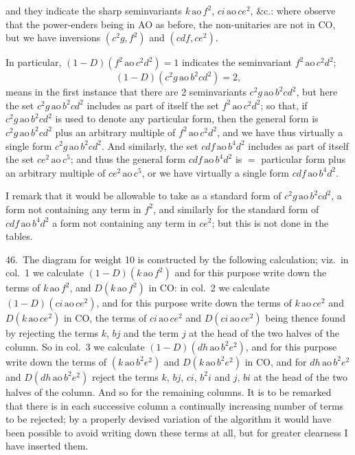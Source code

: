 \documentclass[11pt]{article}
\begin{document}
and they indicate the sharp seminvariants $k\,\mathrm{ao}\,f^2$, $ci\,\mathrm{ao}\,ce^2$, \&c.: where observe that the power-enders being in AO as before, the non-unitaries are not in CO, but we have inversions $(c^2 g, f^2)$ and $(cdf, ce^2)$.

In particular, $(1 - D)(f^2\,\mathrm{ao}\,c^2 d^2) = 1$ indicates the seminvariant $f^2\,\mathrm{ao}\,c^2 d^2$;
\[
(1 - D)(c^2 g\,\mathrm{ao}\,b^2 c d^2) = 2,
\]
means in the first instance that there are 2 seminvariants $c^2 g\,\mathrm{ao}\,b^2 c d^2$, but here the set $c^2 g\,\mathrm{ao}\,b^2 c d^2$ includes as part of itself the set $f^2\,\mathrm{ao}\,c^2 d^2$; so that, if $c^2 g\,\mathrm{ao}\,b^2 c d^2$ is used to denote any particular form, then the general form is $c^2 g\,\mathrm{ao}\,b^2 c d^2$ plus an arbitrary multiple of $f^2\,\mathrm{ao}\,c^2 d^2$, and we have thus virtually a single form $c^2 g\,\mathrm{ao}\,b^2 c d^2$. And similarly, the set $cdf\,\mathrm{ao}\,b^4 d^2$ includes as part of itself the set $ce^2\,\mathrm{ao}\,c^5$; and thus the general form $cdf\,\mathrm{ao}\,b^4 d^2$ is $=$ particular form plus an arbitrary multiple of $ce^2\,\mathrm{ao}\,c^5$, or we have virtually a single form $cdf\,\mathrm{ao}\,b^4 d^2$.

I remark that it would be allowable to take as a standard form of $c^2 g\,\mathrm{ao}\,b^2 c d^2$, a form not containing any term in $f^2$, and similarly for the standard form of $cdf\,\mathrm{ao}\,b^4 d^2$ a form not containing any term in $ce^2$; but this is not done in the tables.

46.\ The diagram for weight 10 is constructed by the following calculation; viz.\ in col.\ 1 we calculate $(1 - D)(k\,\mathrm{ao}\,f^2)$ and for this purpose write down the terms of $k\,\mathrm{ao}\,f^2$, and $D(k\,\mathrm{ao}\,f^2)$ in CO: in col.\ 2 we calculate $(1 - D)(ci\,\mathrm{ao}\,ce^2)$, and for this purpose write down the terms of $k\,\mathrm{ao}\,ce^2$ and $D(k\,\mathrm{ao}\,ce^2)$ in CO, the terms of $ci\,\mathrm{ao}\,ce^2$ and $D(ci\,\mathrm{ao}\,ce^2)$ being thence found by rejecting the terms $k$, $bj$ and the term $j$ at the head of the two halves of the column. So in col.\ 3 we calculate $(1 - D)(dh\,\mathrm{ao}\,b^2 e^2)$, and for this purpose write down the terms of $(k\,\mathrm{ao}\,b^2 e^2)$ and $D(k\,\mathrm{ao}\,b^2 e^2)$ in CO, and for $dh\,\mathrm{ao}\,b^2 e^2$ and $D(dh\,\mathrm{ao}\,b^2 e^2)$ reject the terms $k$, $bj$, $ci$, $b^2 i$ and $j$, $bi$ at the head of the two halves of the column. And so for the remaining columns. It is to be remarked that there is in each successive column a continually increasing number of terms to be rejected; by a properly devised variation of the algorithm it would have been possible to avoid writing down these terms at all, but for greater clearness I have inserted them.
\end{document}
